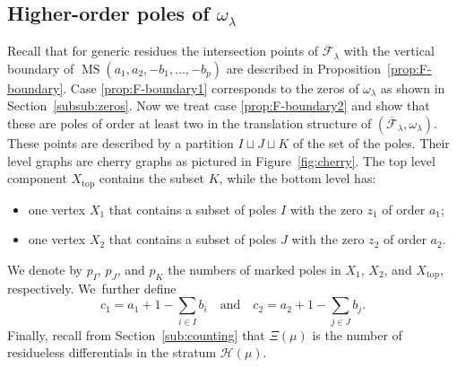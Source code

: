 \documentclass[JEP,XML,SOM,Unicode,NoFloatCountersInSection,published]{cedram}
\newcommand\calH{{\mathcal H}}
\DeclareMathOperator\MS{MS}
\theoremstyle{definition}
\begin{document}
\subsection{Higher-order poles of $\omega_{\lambda}$}\label{subsub:HigherPoles}

Recall that for generic residues the intersection points of $\overline{\mathcal{F}}_{\lambda}$ with the vertical boundary of $\MS(a_{1},a_{2},-b_{1},\dots,-b_{p})$ are described in Proposition~\ref{prop:F-boundary}. Case \eqref{prop:F-boundary1} corresponds to the zeros of $\omega_{\lambda}$ as shown in Section~\ref{subsub:zeros}. Now we treat case \eqref{prop:F-boundary2} and show that these are poles of order at least two in the translation structure of $(\overline{\mathcal{F}}_{\lambda},\omega_{\lambda})$. These points are described by a partition $I \sqcup J \sqcup K$ of the set of the poles. Their level graphs are cherry graphs as pictured in Figure~\ref{fig:cherry}. The top level component $X_\mathrm{top}$ contains the subset $K$, while the bottom level has:
\begin{itemize}
\item one vertex $X_{1}$ that contains a subset of poles $I$ with the zero $z_1$ of order $a_{1}$;
\item one vertex $X_{2}$ that contains a subset of poles $J$ with the zero $z_{2}$ of order $a_{2}$.
\end{itemize}
We denote by $p_{I}$, $p_{J}$, and $p_{K}$ the numbers of marked poles in $X_{1}$, $X_{2}$, and $X_\mathrm{top}$, respectively. We~further define
\begin{equation}\label{eq:prongs}
c_{1}=a_{1}+1-\sum_{i \in I} b_{i} \quad \text{and} \quad c_{2}=a_{2}+1-\sum_{j \in J} b_{j}.
\end{equation}
Finally, recall from Section~\ref{sub:counting} that $\Xi(\mu)$ is the number of residueless differentials in the stratum $\calH(\mu)$.
\end{document}
